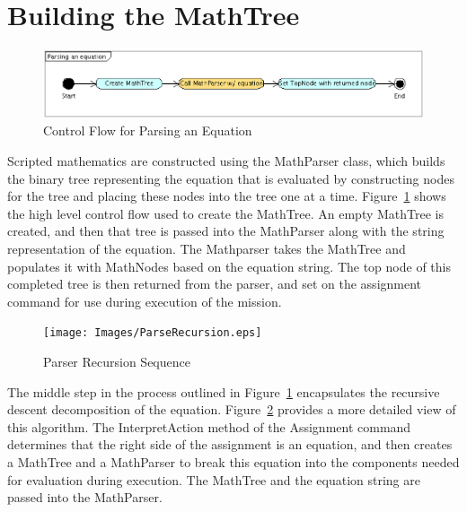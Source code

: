\section{Building the MathTree}

\begin{figure}
\begin{center}
\includegraphics[scale=0.5]{Images/MathParserTop.eps}
\caption{\label{figure:MathParserTop}Control Flow for Parsing an Equation}
\end{center}
\end{figure}

Scripted mathematics are constructed using the MathParser class, which builds
the binary tree representing the equation that is evaluated by constructing
nodes for the tree and placing these nodes into the tree one at a time.
Figure~\ref{figure:MathParserTop} shows the high level control flow used to
create the MathTree.  An empty MathTree is created, and then that tree is
passed into the MathParser along with the string representation of the
equation.  The Mathparser takes the MathTree and populates it with MathNodes
based on the equation string.  The top node of this completed tree is then
returned from the parser, and set on the assignment command for use during
execution of the mission.

\begin{figure}
\begin{center}
\texttt{[image: Images/ParseRecursion.eps]}
\caption{\label{figure:ParserRecursion}Parser Recursion Sequence}
\end{center}
\end{figure}

The middle step in the process outlined in Figure~\ref{figure:MathParserTop}
encapsulates the recursive descent decomposition of the equation.
Figure~\ref{figure:ParserRecursion} provides a more detailed view of this
algorithm.  The InterpretAction method of the Assignment command determines
that the right side of the assignment is an equation, and then creates a
MathTree and a MathParser to break this equation into the components needed for evaluation during
execution.  The MathTree and the equation string are passed
into the MathParser.

